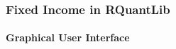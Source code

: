 \documentclass[compress]{beamer}
\begin{document}
\begin{frame}
	\frametitle{Fixed Income in RQuantLib}
	\framesubtitle{Graphical User Interface}		
\begin{center}
\end{center}
\end{frame}
\end{document}
